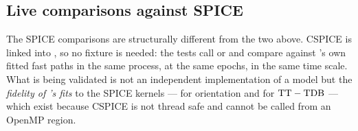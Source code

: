\subsection{Live comparisons against SPICE}
\label{sec:xval-spice}

The SPICE comparisons are structurally different from the two above. CSPICE is
linked into \lupnt{}, so no fixture is needed: the tests call
 or  and compare against \lupnt{}'s
own fitted fast paths in the same process, at the same epochs, in the same
time scale. What is being validated is not an independent implementation of a
model but the \emph{fidelity of \lupnt{}'s fits} to the SPICE kernels ---
 for orientation and
 for $\mathrm{TT}-\mathrm{TDB}$ --- which exist because CSPICE is not
thread safe and cannot be called from an OpenMP region.

